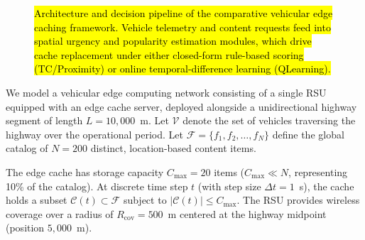 \documentclass[preprint,12pt]{elsarticle}
\begin{document}
	\begin{figure}[t]
		\centering
		\caption{\hl{Architecture and decision pipeline of the comparative vehicular edge caching framework. Vehicle telemetry and content requests feed into spatial urgency and popularity estimation modules, which drive cache replacement under either closed-form rule-based scoring (TC/Proximity) or online temporal-difference learning (QLearning).}}
		\label{fig:architecture}
	\end{figure}
	
	We model a vehicular edge computing network consisting of a single RSU equipped with an edge cache server, deployed alongside a unidirectional highway segment of length $L = 10{,}000$~m. Let $\mathcal{V}$ denote the set of vehicles traversing the highway over the operational period. Let $\mathcal{F} = \{f_1, f_2, \dots, f_N\}$ define the global catalog of $N = 200$ distinct, location-based content items.
	
	The edge cache has storage capacity $C_\text{max} = 20$ items ($C_\text{max} \ll N$, representing 10\% of the catalog). At discrete time step $t$ (with step size $\Delta t = 1$~s), the cache holds a subset $\mathcal{C}(t) \subset \mathcal{F}$ subject to $|\mathcal{C}(t)| \leq C_\text{max}$. The RSU provides wireless coverage over a radius of $R_\text{cov} = 500$~m centered at the highway midpoint (position $5{,}000$~m).
	
\end{document}
